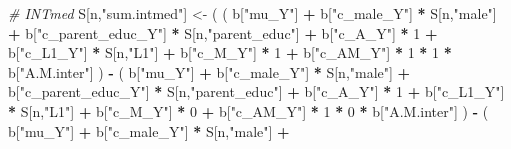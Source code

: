 \documentclass[
]{book}
\newenvironment{Shaded}{\begin{snugshade}}{\end{snugshade}}
\newcommand{\CommentTok}[1]{\textcolor[rgb]{0.56,0.35,0.01}{\textit{#1}}}
\newcommand{\DecValTok}[1]{\textcolor[rgb]{0.00,0.00,0.81}{#1}}
\newcommand{\NormalTok}[1]{#1}
\newcommand{\OtherTok}[1]{\textcolor[rgb]{0.56,0.35,0.01}{#1}}
\newcommand{\SpecialCharTok}[1]{\textcolor[rgb]{0.81,0.36,0.00}{\textbf{#1}}}
\newcommand{\StringTok}[1]{\textcolor[rgb]{0.31,0.60,0.02}{#1}}
\begin{document}
\begin{Shaded}
\begin{Highlighting}[]
    \CommentTok{\# INTmed }
\NormalTok{    S[n,}\StringTok{"sum.intmed"}\NormalTok{] }\OtherTok{\textless{}{-}}\NormalTok{ ( ( b[}\StringTok{"mu\_Y"}\NormalTok{] }\SpecialCharTok{+} 
\NormalTok{                               b[}\StringTok{"c\_male\_Y"}\NormalTok{] }\SpecialCharTok{*}\NormalTok{ S[n,}\StringTok{"male"}\NormalTok{] }\SpecialCharTok{+} 
\NormalTok{                               b[}\StringTok{"c\_parent\_educ\_Y"}\NormalTok{] }\SpecialCharTok{*}\NormalTok{ S[n,}\StringTok{"parent\_educ"}\NormalTok{] }\SpecialCharTok{+} 
\NormalTok{                               b[}\StringTok{"c\_A\_Y"}\NormalTok{] }\SpecialCharTok{*} \DecValTok{1} \SpecialCharTok{+} 
\NormalTok{                               b[}\StringTok{"c\_L1\_Y"}\NormalTok{] }\SpecialCharTok{*}\NormalTok{ S[n,}\StringTok{"L1"}\NormalTok{] }\SpecialCharTok{+}
\NormalTok{                               b[}\StringTok{"c\_M\_Y"}\NormalTok{] }\SpecialCharTok{*} \DecValTok{1} \SpecialCharTok{+}
\NormalTok{                               b[}\StringTok{"c\_AM\_Y"}\NormalTok{] }\SpecialCharTok{*} \DecValTok{1} \SpecialCharTok{*} \DecValTok{1} \SpecialCharTok{*}\NormalTok{ b[}\StringTok{"A.M.inter"}\NormalTok{] ) }\SpecialCharTok{{-}} 
\NormalTok{                             ( b[}\StringTok{"mu\_Y"}\NormalTok{] }\SpecialCharTok{+} 
\NormalTok{                                 b[}\StringTok{"c\_male\_Y"}\NormalTok{] }\SpecialCharTok{*}\NormalTok{ S[n,}\StringTok{"male"}\NormalTok{] }\SpecialCharTok{+} 
\NormalTok{                                 b[}\StringTok{"c\_parent\_educ\_Y"}\NormalTok{] }\SpecialCharTok{*}\NormalTok{ S[n,}\StringTok{"parent\_educ"}\NormalTok{] }\SpecialCharTok{+} 
\NormalTok{                                 b[}\StringTok{"c\_A\_Y"}\NormalTok{] }\SpecialCharTok{*} \DecValTok{1} \SpecialCharTok{+} 
\NormalTok{                                 b[}\StringTok{"c\_L1\_Y"}\NormalTok{] }\SpecialCharTok{*}\NormalTok{ S[n,}\StringTok{"L1"}\NormalTok{] }\SpecialCharTok{+}
\NormalTok{                                 b[}\StringTok{"c\_M\_Y"}\NormalTok{] }\SpecialCharTok{*} \DecValTok{0} \SpecialCharTok{+}
\NormalTok{                                 b[}\StringTok{"c\_AM\_Y"}\NormalTok{] }\SpecialCharTok{*} \DecValTok{1} \SpecialCharTok{*} \DecValTok{0} \SpecialCharTok{*}\NormalTok{ b[}\StringTok{"A.M.inter"}\NormalTok{] ) }\SpecialCharTok{{-}} 
\NormalTok{                             ( b[}\StringTok{"mu\_Y"}\NormalTok{] }\SpecialCharTok{+} 
\NormalTok{                                 b[}\StringTok{"c\_male\_Y"}\NormalTok{] }\SpecialCharTok{*}\NormalTok{ S[n,}\StringTok{"male"}\NormalTok{] }\SpecialCharTok{+} 

\end{Highlighting}
\end{Shaded}
\end{document}
